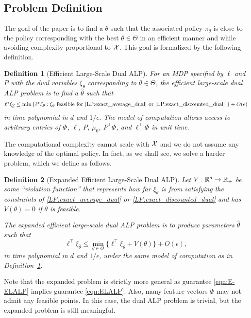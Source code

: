 \documentclass[11pt]{article}
\newtheorem{definition}{Definition}
\begin{document}
\subsection{Problem Definition}
The goal of the paper is to find a $\theta$ such that the associated policy $\pi_{\theta}$ is close to the policy corresponding with the best $\theta \in\Theta$ in an efficient manner and while avoiding complexity proportional to $\cX$. This goal is formalized by the following definition.
\begin{definition}[Efficient Large-Scale Dual ALP]
\label{defn:ELALP}
For an MDP specified by $\ell$ and $P$ with the dual variables $\xi_\theta$ corresponding to $\theta\in\Theta$,
the efficient large-scale dual ALP problem is to find a $\widehat\theta$ such that
\begin{equation}\label{eqn:ELALP}
\ell^\top\xi_{\widehat \theta}
  \leq \min\left\{ \ell^\top\xi_\theta : \text{$\xi_\theta$ feasible
  for \eqref{LP:exact_average_dual} or \eqref{LP:exact_discounted_dual}
}\right\} + O(\epsilon)
\end{equation}
in time polynomial in $d$ and $1/\epsilon$. The model of computation
allows access to arbitrary entries of $\Phi$, $\ell$,
$P$, $\mu_0$, $P^\top\Phi$, and $\ell^\top\Phi$ in unit time.
\end{definition}
The computational complexity cannot scale with $\cX$ and we do not assume
any knowledge of the optimal policy. In fact, as we shall see, we
solve a harder problem, which we define as follows.

\begin{definition}[Expanded Efficient Large-Scale Dual ALP]
\label{defn:E.ELALP}
Let $V:\Reals^d\to\Reals_+$ be some ``violation function'' that
represents how far $\xi_\theta$ is from satisfying the constraints of \eqref{LP:exact_average_dual} or \eqref{LP:exact_discounted_dual} and has $V(\theta)=0$ if $\theta$ is feasible.

The expanded efficient large-scale dual ALP
problem is to produce parameters $\widehat\theta$ such that
\begin{equation}
\label{eqn:E-ELALP}
\ell^\top\xi_{\widehat \theta} \leq  \min_{\theta\in\Theta} \{ \ell^\top\xi_\theta
+V(\theta)\} +O(\epsilon),
\end{equation}
in time polynomial in $d$ and $1/\epsilon$, under the same model of
computation as in Definition~\ref{defn:ELALP}.
\end{definition}

Note that the expanded problem is strictly more general as guarantee
\eqref{eqn:E-ELALP} implies guarantee \eqref{eqn:ELALP}. Also, many
feature vectors $\Phi$ may not admit any feasible points. In this
case, the dual ALP problem is trivial, but the expanded problem is
still meaningful.
\end{document}
